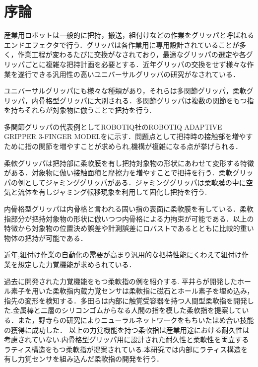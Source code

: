\section{序論}
\label{sec:序論}
産業用ロボットは一般的に把持，搬送，組付けなどの作業をグリッパと呼ばれるエンドエフェクタで行う．グリッパは各作業用に専用設計されていることが多く，作業工程が変わるたびに交換がなされており，最適なグリッパの選定や各グリッパごとに複雑な把持計画を必要とする\cite{nishida}．近年グリッパの交換をせず様々な作業を遂行できる汎用性の高いユニバーサルグリッパの研究がなされている\cite{end}．\par
ユニバーサルグリッパにも様々な種類があり，それらは多関節グリッパ，柔軟グリッパ，内骨格型グリッパに大別される．多関節グリッパは複数の関節をもつ指を持ちそれらが対象物に倣うことで把持を行う\cite{takansetsu}.\par
多関節グリッパの代表例としてROBOTIQ社のROBOTIQ ADAPTIVE GRIPPER 3-FINGER MODELをに示す．問題点として把持時の接触部を増やすために指の関節を増やすことが求められ,機構が複雑になる点が挙げられる．\par
柔軟グリッパは把持部に柔軟膜を有し把持対象物の形状にあわせて変形する特徴がある．対象物に倣い接触面積と摩擦力を増やすことで把持を行う．柔軟グリッパの例としてジャミンググリッパがある\cite{jam}．ジャミンググリッパは柔軟膜の中に空気と流体を有しジャミング転移現象を利用して固化し把持を行う. \par
内骨格型グリッパは内骨格と言われる固い指の表面に柔軟膜を有している．柔軟指部分が把持対象物の形状に倣いつつ内骨格による力拘束が可能である．以上の特徴から対象物の位置決め誤差や計測誤差にロバストであるとともに比較的重い物体の把持が可能である．\par
近年,組付け作業の自動化の需要が高まり汎用的な把持性能にくわえて組付け作業を想定した力覚機能が求められている\cite{sensor}．\par
過去に開発された力覚機能をもつ柔軟指の例を紹介する.
平井らが開発したホール素子を用いた柔軟指内蔵力覚センサは柔軟指に磁石とホール素子を埋め込み，指先の変形を検知する\cite{hole}．多田らは内部に触覚受容器を持つ人間型柔軟指を開発した.金属棒と二層のシリコンゴムからなる人間の指を模した柔軟指を提案している\cite{ningen}．また，野寺らの研究によりニューラルネットワークをもちいたはめ合い技能の獲得に成功した\cite{hameai}．
以上の力覚機能を持つ柔軟指は産業用途における耐久性は考慮されていない.内骨格型グリッパ用に設計された耐久性と柔軟性を両立するラティス構造をもつ柔軟指が提案されている.本研究では内部にラティス構造を有し力覚センサを組み込んだ柔軟指の開発を行う．

